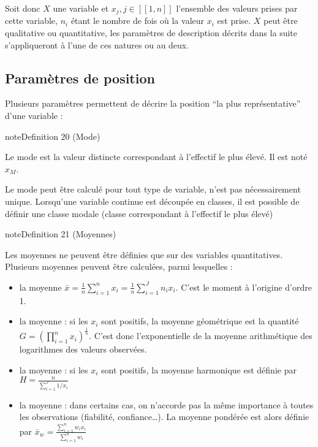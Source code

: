 \documentclass[letterpaper,10pt,english]{jupyterBook}
\begin{document}
\sphinxAtStartPar
Soit donc \(X\) une variable et \(x_j,j\in [\![1,n]\!]\) l’ensemble des valeurs prises par cette variable, \(n_i\) étant le nombre de fois où la valeur \(x_i\) est prise. \(X\) peut être qualitative ou quantitative, les paramètres de description décrits dans la suite s’appliqueront à l’une de ces natures ou au deux.


\subsection{Paramètres de position}
\label{\detokenize{statsdescriptives:parametres-de-position}}
\sphinxAtStartPar
Plusieurs paramètres permettent de décrire la position “la plus représentative” d’une variable :
\label{statsdescriptives:definition-4}
\begin{sphinxadmonition}{note}{Definition 20 (Mode)}



\sphinxAtStartPar
Le mode est la valeur distincte correspondant à l’effectif le plus élevé. Il est noté \(x_M\).
\end{sphinxadmonition}

\sphinxAtStartPar
Le mode peut être calculé pour tout type de variable, n’est pas nécessairement unique. Lorsqu’une variable continue est découpée en classes, il est possible de définir une classe modale (classe correspondant à l’effectif le plus élevé)
\label{statsdescriptives:definition-5}
\begin{sphinxadmonition}{note}{Definition 21 (Moyennes)}



\sphinxAtStartPar
Les moyennes ne peuvent être définies que sur des variables quantitatives. Plusieurs moyennes peuvent être calculées, parmi lesquelles :
\begin{itemize}
\item {} 
\sphinxAtStartPar
la moyenne   \(\bar{x} = \frac{1}{n}{\displaystyle\sum_{i=1}^nx_i}=  \frac{1}{n}{\displaystyle\sum_{i=1}^J n_ix_i}\). C’est le moment à l’origine d’ordre 1.

\item {} 
\sphinxAtStartPar
la moyenne  : si les \(x_i\) sont positifs, la moyenne géométrique est la quantité \(G=\left (\displaystyle\prod_{i=1}^n x_i\right )^\frac{1}{n}\). C’est donc l’exponentielle de la moyenne arithmétique des logarithmes des valeurs observées.

\item {} 
\sphinxAtStartPar
la moyenne  : si les \(x_i\) sont positifs, la moyenne harmonique est définie par \(H=\frac{n}{\displaystyle\sum_{i=1}^J 1/x_i}\)

\item {} 
\sphinxAtStartPar
la moyenne  : dans certains cas, on n’accorde pas la même importance à toutes les observations (fiabilité, confiance…). La moyenne pondérée est alors définie par
\(\bar{x}_w= \frac{\displaystyle\sum_{i=1}^n w_ix_i}{\displaystyle\sum_{i=1}^n w_i}\)

\end{itemize}
\end{sphinxadmonition}
\end{document}
